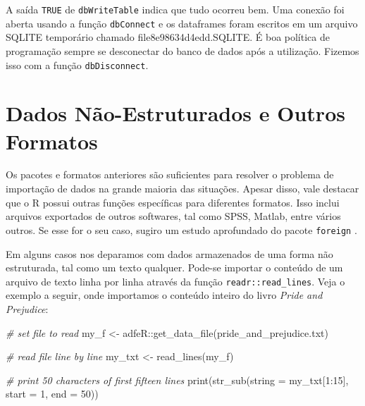 \documentclass[
  11pt,
]{book}
\newenvironment{Shaded}{\begin{snugshade}}{\end{snugshade}}
\newcommand{\AttributeTok}[1]{\textcolor[rgb]{0.61,0.61,0.61}{#1}}
\newcommand{\CommentTok}[1]{\textcolor[rgb]{0.37,0.37,0.37}{\textit{#1}}}
\newcommand{\DecValTok}[1]{\textcolor[rgb]{0.06,0.06,0.06}{#1}}
\newcommand{\FunctionTok}[1]{\textcolor[rgb]{0,0,0}{#1}}
\newcommand{\NormalTok}[1]{#1}
\newcommand{\OtherTok}[1]{\textcolor[rgb]{0.37,0.37,0.37}{#1}}
\newcommand{\SpecialCharTok}[1]{\textcolor[rgb]{0,0,0}{#1}}
\newcommand{\StringTok}[1]{\textcolor[rgb]{0.5,0.5,0.5}{#1}}
\begin{document}
A saída \texttt{TRUE} de \texttt{dbWriteTable} indica que tudo ocorreu bem. Uma conexão foi aberta usando a função \texttt{dbConnect} e os dataframes foram escritos em um arquivo SQLITE temporário chamado file8e98634d4edd.SQLITE. É boa política de programação sempre se desconectar do banco de dados após a utilização. Fizemos isso com a função \texttt{dbDisconnect}.   

\hypertarget{dados-nuxe3o-estruturados-e-outros-formatos}{%
\section{Dados Não-Estruturados e Outros Formatos}\label{dados-nuxe3o-estruturados-e-outros-formatos}}

Os pacotes e formatos anteriores são suficientes para resolver o problema de importação de dados na grande maioria das situações. Apesar disso, vale destacar que o R possui outras funções específicas para diferentes formatos. Isso inclui arquivos exportados de outros softwares, tal como SPSS, Matlab, entre vários outros. Se esse for o seu caso, sugiro um estudo aprofundado do pacote \texttt{foreign} \citep{R-foreign}.

Em alguns casos nos deparamos com dados armazenados de uma forma não estruturada, tal como um texto qualquer. Pode-se importar o conteúdo de um arquivo de texto linha por linha através da função \texttt{readr::read\_lines}. Veja o exemplo a seguir, onde importamos o conteúdo inteiro do livro \emph{Pride and Prejudice}:

\begin{Shaded}
\begin{Highlighting}[]
\CommentTok{\# set file to read}
\NormalTok{my\_f }\OtherTok{\textless{}{-}}\NormalTok{ adfeR}\SpecialCharTok{::}\FunctionTok{get\_data\_file}\NormalTok{(}\StringTok{\textquotesingle{}pride\_and\_prejudice.txt\textquotesingle{}}\NormalTok{)}

\CommentTok{\# read file line by line}
\NormalTok{my\_txt }\OtherTok{\textless{}{-}} \FunctionTok{read\_lines}\NormalTok{(my\_f)}

\CommentTok{\# print 50 characters of first fifteen lines}
\FunctionTok{print}\NormalTok{(}\FunctionTok{str\_sub}\NormalTok{(}\AttributeTok{string =}\NormalTok{ my\_txt[}\DecValTok{1}\SpecialCharTok{:}\DecValTok{15}\NormalTok{], }
              \AttributeTok{start =} \DecValTok{1}\NormalTok{, }
              \AttributeTok{end =} \DecValTok{50}\NormalTok{))}
\end{Highlighting}
\end{Shaded}
\end{document}
